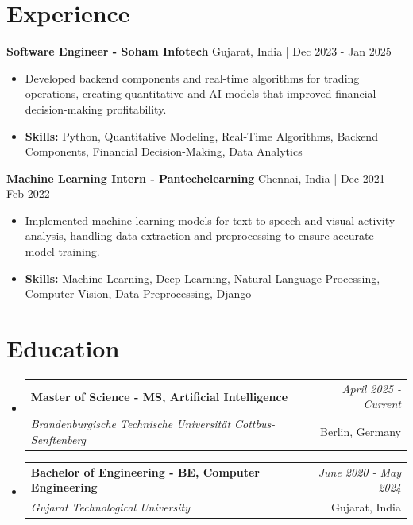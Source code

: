 \documentclass[a4paper,11pt]{article}
\makeatletter
\newcommand{\resumeSubheading}[4]{
\vspace{0.5mm}\item
    \begin{tabular*}{0.98\textwidth}[t]{l@{\extracolsep{\fill}}r}
        \textbf{#1} & \textit{\footnotesize{#4}} \\
        \textit{\footnotesize{#3}} &  \footnotesize{#2}\\
    \end{tabular*}
    \vspace{-2.4mm}
}
\makeatother
\begin{document}
\section{\textbf{Experience}}


\vspace{1mm}
  \textbf{Software Engineer - Soham Infotech} \hfill Gujarat, India | Dec 2023 - Jan 2025
\vspace{-1.5mm} %
\begin{itemize}
  \item Developed backend components and real-time algorithms for trading operations, creating quantitative and AI models that improved financial decision-making profitability.

\vspace{-2mm}
  \item \textbf{Skills:} Python, Quantitative Modeling, Real-Time Algorithms, Backend Components, Financial Decision-Making, Data Analytics
\end{itemize}

\vspace{1mm}
  \textbf{Machine Learning Intern - Pantechelearning} \hfill Chennai, India | Dec 2021 - Feb 2022
\vspace{-1.5mm} %
\begin{itemize}
  \item Implemented machine-learning models for text-to-speech and visual activity analysis, handling data extraction and preprocessing to ensure accurate model training.
\vspace{-2mm}
  \item \textbf{Skills:} Machine Learning, Deep Learning, Natural Language Processing, Computer Vision, Data Preprocessing, Django
\end{itemize}\section{\textbf{Education}}
\vspace{-0.4mm}

\begin{itemize}
\resumeSubheading
{Master of Science - MS, Artificial Intelligence }{Berlin, Germany}
{Brandenburgische Technische Universität Cottbus-Senftenberg  }{April 2025 - Current}

\vspace{1.0mm} %
\resumeSubheading
{Bachelor of Engineering - BE, Computer Engineering  }{Gujarat, India}
{Gujarat Technological University }{June 2020 - May 2024}

\end{itemize}
\end{document}
